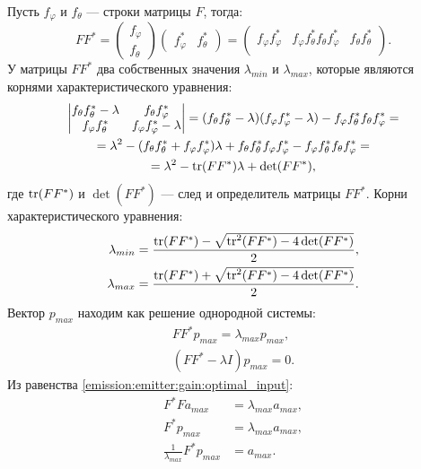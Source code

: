 Пусть $f_\varphi$ и $f_\theta$ --- строки матрицы $F$, тогда:
\[
    F F^*
    = \begin{pmatrix}
        f_\varphi \\
        f_\theta
    \end{pmatrix}
    \begin{pmatrix}
        f_\varphi^* & f_\theta^*
    \end{pmatrix}
    = \begin{pmatrix}
        f_\varphi f_\varphi^*  & f_\varphi f_\theta^*
        f_{\theta} f_\varphi^* & f_\theta f_\theta^*  \\
    \end{pmatrix} .
\]
У матрицы $F F^*$ два собственных значения $\lambda_{min}$ и $\lambda_{max}$, которые являются корнями характеристического уравнения:
\begin{multline*}
    \begin{vmatrix}
        f_\theta f_\theta^* - \lambda & f_{\theta} f_\varphi^*          \\
        f_\varphi f_\theta^*          & f_\varphi f_\varphi^* - \lambda
    \end{vmatrix}
    = (f_\theta f_\theta^* - \lambda) (f_\varphi f_\varphi^* - \lambda) - f_\varphi f_\theta^* f_{\theta} f_\varphi^* = \\
    = \lambda^2 - ( f_\theta f_\theta^* + f_\varphi f_\varphi^* ) \lambda + f_\theta f_\theta^* f_\varphi f_\varphi^* - f_\varphi f_\theta^* f_{\theta} f_\varphi^* = \\
    = \lambda^2 - \operatorname{tr}(F F^*) \lambda + \det(F F^*) ,
\end{multline*}
где $\operatorname{tr}(F F^*)$ и $\det(F F^*)$ --- след и определитель матрицы $F F^*$. Корни характеристического уравнения:
\begin{align}
    \lambda_{min} & = \frac{\operatorname{tr}(F F^*) - \sqrt{\operatorname{tr}^2(F F^*) - 4 \det(F F^*)}}{2} \label{emission:emitter:gain:minimum_eigenvalue} , \\
    \lambda_{max} & = \frac{\operatorname{tr}(F F^*) + \sqrt{\operatorname{tr}^2(F F^*) - 4 \det(F F^*)}}{2} \label{emission:emitter:gain:maximum_eigenvalue}.
\end{align}
Вектор $p_{max}$ находим как решение однородной системы:
\begin{gather*}
    F F^* p_{max} = \lambda_{max} p_{max} , \\
    ( F F^* - \lambda I ) p_{max} = 0 .
\end{gather*}
Из равенства \eqref{emission:emitter:gain:optimal_input}:
\begin{align*}
    F^* F a_{max}                       & = \lambda_{max} a_{max} , \\
    F^* p_{max}                         & = \lambda_{max} a_{max} , \\
    \frac{1}{\lambda_{max}} F^* p_{max} & = a_{max} .
\end{align*}

